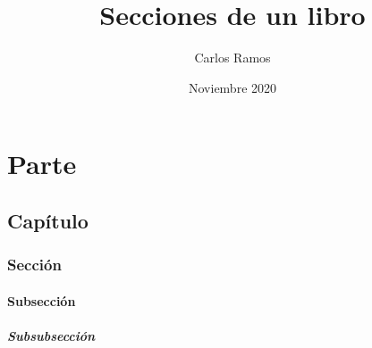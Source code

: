 \documentclass{book}
\title{Secciones de un libro}
\author{Carlos Ramos}
\date{Noviembre 2020}
\begin{document}
\maketitle

\part{Parte}

\chapter{Capítulo}

\section{Sección}

\subsection{Subsección}

\subsubsection{Subsubsección}
\end{document}
